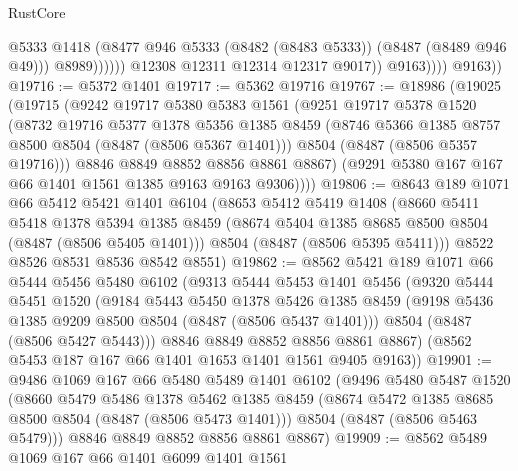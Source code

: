 \begin{lexlean}{RustCore}
\begin{coremodule}
                                @5333
                                @1418
                                (@8477 @946 @5333 (@8482 (@8483 @5333)) (@8487 (@8489 @946 @49)))
                                @8989))))))
                    @12308
                    @12311
                    @12314
                    @12317
                    @9017))
                @9163))))
        @9163))
@19716 := @5372 @1401
@19717 := @5362 @19716
@19767 := @18986
    (@19025
      (@19715
        (@9242
          @19717
          @5380
          @5383
          @1561
          (@9251
            @19717
            @5378
            @1520
            (@8732
              @19716
              @5377
              @1378
              @5356
              @1385
              @8459
              (@8746 @5366 @1385 @8757 @8500 @8504 (@8487 (@8506 @5367 @1401)))
              @8504
              (@8487 (@8506 @5357 @19716)))
            @8846
            @8849
            @8852
            @8856
            @8861
            @8867)
          (@9291 @5380 @167 @167 @66 @1401 @1561 @1385 @9163 @9163 @9306))))
@19806 := @8643
    @189
    @1071
    @66
    @5412
    @5421
    @1401
    @6104
    (@8653
      @5412
      @5419
      @1408
      (@8660
        @5411
        @5418
        @1378
        @5394
        @1385
        @8459
        (@8674 @5404 @1385 @8685 @8500 @8504 (@8487 (@8506 @5405 @1401)))
        @8504
        (@8487 (@8506 @5395 @5411)))
      @8522
      @8526
      @8531
      @8536
      @8542
      @8551)
@19862 := @8562
    @5421
    @189
    @1071
    @66
    @5444
    @5456
    @5480
    @6102
    (@9313
      @5444
      @5453
      @1401
      @5456
      (@9320
        @5444
        @5451
        @1520
        (@9184
          @5443
          @5450
          @1378
          @5426
          @1385
          @8459
          (@9198 @5436 @1385 @9209 @8500 @8504 (@8487 (@8506 @5437 @1401)))
          @8504
          (@8487 (@8506 @5427 @5443)))
        @8846
        @8849
        @8852
        @8856
        @8861
        @8867)
      (@8562 @5453 @187 @167 @66 @1401 @1653 @1401 @1561 @9405 @9163))
@19901 := @9486
    @1069
    @167
    @66
    @5480
    @5489
    @1401
    @6102
    (@9496
      @5480
      @5487
      @1520
      (@8660
        @5479
        @5486
        @1378
        @5462
        @1385
        @8459
        (@8674 @5472 @1385 @8685 @8500 @8504 (@8487 (@8506 @5473 @1401)))
        @8504
        (@8487 (@8506 @5463 @5479)))
      @8846
      @8849
      @8852
      @8856
      @8861
      @8867)
@19909 := @8562 @5489 @1069 @167 @66 @1401 @6099 @1401 @1561

\end{coremodule}
\end{lexlean}
